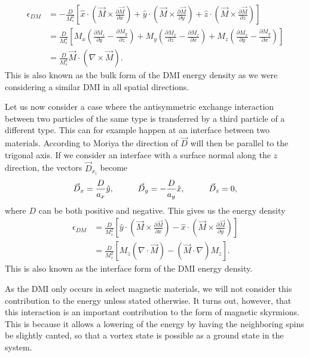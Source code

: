 \documentclass[12pt, a4paper]{article}		%
\numberwithin{equation}{section}
\begin{document}
\begin{align}
\nonumber \epsilon_{DM} &= -\frac{D}{M_s^2} \left[ \hat{x}\cdot(\vec{M}\times\frac{\partial\vec{M}}{\partial x}) + \hat{y}\cdot(\vec{M}\times\frac{\partial\vec{M}}{\partial y}) + \hat{z}\cdot (\vec{M}\times\frac{\partial\vec{M}}{\partial z})\right] \\
\nonumber &= \frac{D}{M_s^2}\left[M_x(\frac{\partial M_z}{\partial y} - \frac{\partial M_y}{\partial z}) + M_y(\frac{\partial M_x}{\partial z} - \frac{\partial M_z}{\partial x}) + M_z(\frac{\partial M_x}{\partial y} - \frac{\partial M_y}{\partial x})\right] \\
&= \frac{D}{M_s^2} \vec{M}\cdot(\nabla\times\vec{M}). \label{eq:BulkDMI}
\end{align}
This is also known as the bulk form of the DMI energy density as we were considering a similar DMI in all spatial directions.

Let us now consider a case where the antisymmetric exchange interaction between two particles of the same type is transferred by a third particle of a different type. This can for example happen at an interface between two materials. According to Moriya the direction of $\vec{D}$ will then be parallel to the trigonal axis. If we consider an interface with a surface normal along the $z$ direction, the vectors $\vec{D}_{x_i}$ become
\begin{align}
\vec{D}_x = \frac{D}{a_x} \hat{y}, \hspace{10mm}
\vec{D}_y = - \frac{D}{a_y} \hat{x}, \hspace{10mm}
\vec{D}_z = 0,
\end{align}
where $D$ can be both positive and negative. This gives us the energy density
\begin{align}
\label{eq:InterfaceDMIe}
\epsilon_{DM} &= \frac{D}{M_s^2}\left[ \hat{y} \cdot(\vec{M}\times\frac{\partial\vec{M}}{\partial x}) - \hat{x} \cdot(\vec{M}\times\frac{\partial\vec{M}}{\partial y})\right] \\
&= \frac{D}{M_s^2}\left[ M_z (\nabla\cdot\vec{M}) - (\vec{M}\cdot\nabla)M_z\right]. \label{eq:IntDMI}
\end{align}
This is also known as the interface form of the DMI energy density.

As the DMI only occurs in select magnetic materials, we will not consider this contribution to the energy unless stated otherwise. It turns out, however, that this interaction is an important contribution to the form of magnetic skyrmions. This is because it allows a lowering of the energy by having the neighboring spins be slightly canted, so that a vortex state is possible as a ground state in the system.
\end{document}
